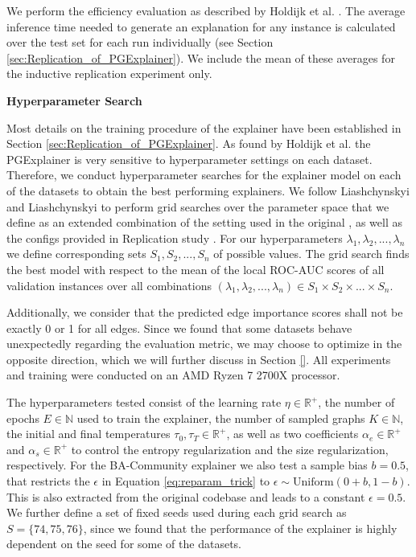 We perform the efficiency evaluation as described by Holdijk et al. \cite{holdijk2021re}. The average inference time needed to generate an explanation for any instance is calculated over the test set for each run individually (see Section \ref{sec:Replication_of_PGExplainer}). We include the mean of these averages for the inductive replication experiment only. \bigskip

\textbf{Hyperparameter Search}\par
Most details on the training procedure of the explainer have been established in Section \ref{sec:Replication_of_PGExplainer}. As found by Holdijk et al. \cite{holdijk2021re} the PGExplainer is very sensitive to hyperparameter settings on each dataset. Therefore, we conduct hyperparameter searches for the explainer model on each of the datasets to obtain the best performing explainers. We follow Liashchynskyi and Liashchynskyi \cite{liashchynskyi2019grid} to perform grid searches over the parameter space that we define as an extended combination of the setting used in the original \cite{luo2020parameterized}, as well as the configs provided in Replication study \cite{holdijk2021re}. For our hyperparameters $\lambda_1,\lambda_2,...,\lambda_n$ we define corresponding sets $S_1,S_2,...,S_n$ of possible values. The grid search finds the best model with respect to the mean of the local ROC-AUC scores of all validation instances over all combinations $(\lambda_1,\lambda_2,...,\lambda_n) \in S_1\times S_2 \times...\times S_n$. 

Additionally, we consider that the predicted edge importance scores shall not be exactly 0 or 1 for all edges. Since we found that some datasets behave unexpectedly regarding the evaluation metric, we may choose to optimize in the opposite direction, which we will further discuss in Section \ref{}. All experiments and training were conducted on an AMD Ryzen 7 2700X processor.

The hyperparameters tested consist of the learning rate $\eta \in \mathbb{R}^+$, the number of epochs $E \in \mathbb{N}$ used to train the explainer, the number of sampled graphs $K \in \mathbb{N}$, the initial and final temperatures $\tau_0, \tau_T \in \mathbb{R}^+$, as well as two coefficients $\alpha_e\in \mathbb{R}^+$ and $\alpha_s\in \mathbb{R}^+$ to control the entropy regularization and the size regularization, respectively. For the BA-Community explainer we also test a sample bias $b=0.5$, that restricts the $\epsilon$ in Equation \ref{eq:reparam_trick} to $\epsilon \sim \text{Uniform}(0+b,1-b)$. This is also extracted from the original codebase and leads to a constant $\epsilon=0.5$. We further define a set of fixed seeds used during each grid search as $S=\{74,75,76\}$, since we found that the performance of the explainer is highly dependent on the seed for some of the datasets.


